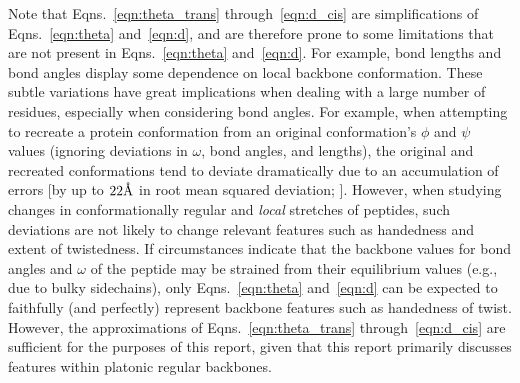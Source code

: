 \documentclass[fleqn,10pt,lineno]{wlpeerj} %
\newcommand{\n}[1]{{\color{blue}#1}}
\newcommand{\Eqns}[1]{Eqns.~\ref{#1}}
\begin{document}
\n{Note that \Eqns{eqn:theta_trans} through~\ref{eqn:d_cis} are simplifications of \Eqns{eqn:theta} and~\ref{eqn:d}, and are therefore prone to some limitations that are not present in \Eqns{eqn:theta} and~\ref{eqn:d}. For example, bond lengths \citep{Improta2015} and bond angles \citep{Esposito2013,Improta2015a} display some dependence on local backbone conformation. These subtle variations have great implications when dealing with a large number of residues, especially when considering bond angles. For example, when attempting to recreate a protein conformation from an original conformation's $\phi$ and $\psi$ values (ignoring deviations in $\omega$, bond angles, and lengths), the original and recreated conformations tend to deviate dramatically due to an accumulation of errors [by up to $22\textrm\AA$ in root mean squared deviation; \cite{Tien2013}]. However, when studying changes in conformationally regular and {\em local} stretches of peptides, such deviations are not likely to change relevant features such as handedness and extent of twistedness. If circumstances indicate that the backbone values for bond angles and $\omega$ of the peptide may be strained from their equilibrium values (e.g., due to bulky sidechains), only \Eqns{eqn:theta} and~\ref{eqn:d} can be expected to faithfully (and perfectly) represent backbone features such as \n{handedness of twist}. However, the approximations of \Eqns{eqn:theta_trans} through~\ref{eqn:d_cis} are sufficient for the purposes of this report, given that this report primarily discusses features within platonic regular backbones.}
\end{document}
